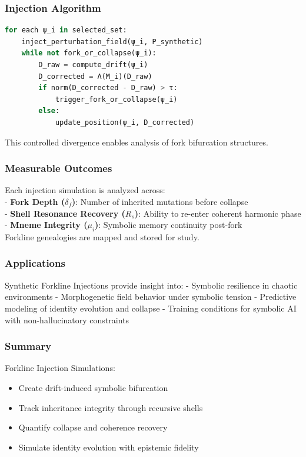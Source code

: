 \documentclass[12pt]{article}
\begin{document}
\subsubsection{Injection Algorithm}

\begin{lstlisting}[language=Python, caption={Forkline Injection Drift Loop}]
for each ψ_i in selected_set:
    inject_perturbation_field(ψ_i, P_synthetic)
    while not fork_or_collapse(ψ_i):
        D_raw = compute_drift(ψ_i)
        D_corrected = Λ(M_i)(D_raw)
        if norm(D_corrected - D_raw) > τ:
            trigger_fork_or_collapse(ψ_i)
        else:
            update_position(ψ_i, D_corrected)
\end{lstlisting}

This controlled divergence enables analysis of fork bifurcation structures.

\subsubsection{Measurable Outcomes}

Each injection simulation is analyzed across:\\
- \textbf{Fork Depth (\( \delta_f \))}: Number of inherited mutations before collapse\\
- \textbf{Shell Resonance Recovery (\( R_s \))}: Ability to re-enter coherent harmonic phase\\
- \textbf{Mneme Integrity (\( \mu_i \))}: Symbolic memory continuity post-fork\\

Forkline genealogies are mapped and stored for study.

\subsubsection{Applications}

Synthetic Forkline Injections provide insight into:
- Symbolic resilience in chaotic environments
- Morphogenetic field behavior under symbolic tension
- Predictive modeling of identity evolution and collapse
- Training conditions for symbolic AI with non-hallucinatory constraints

\subsubsection{Summary}

Forkline Injection Simulations:
\begin{itemize}[noitemsep]
  \item Create drift-induced symbolic bifurcation
  \item Track inheritance integrity through recursive shells
  \item Quantify collapse and coherence recovery
  \item Simulate identity evolution with epistemic fidelity
\end{itemize}
\end{document}
